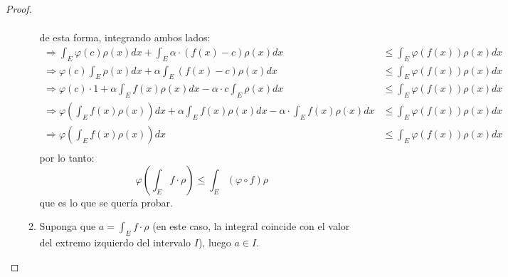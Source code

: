 \documentclass[12pt]{report}
\theoremstyle{largebreak}
\begin{document}
\begin{proof}
\begin{enumerate}
\begin{enumerate}
\begin{equation*}
\begin{split}
                    \end{split}
                \end{equation*}
                de esta forma, integrando ambos lados:
                \begin{equation*}
                    \begin{split}
                        \Rightarrow \int_E\varphi(c)\rho(x)dx+\int_E\alpha\cdot(f(x)-c)\rho(x)dx&\leq\int_E\varphi(f(x))\rho(x)dx\\
                        \Rightarrow \varphi(c)\int_E\rho(x)dx+\alpha\int_E(f(x)-c)\rho(x)dx&\leq\int_E\varphi(f(x))\rho(x)dx\\
                        \Rightarrow \varphi(c)\cdot1+\alpha\int_Ef(x)\rho(x)dx-\alpha\cdot c\int_E\rho(x)dx&\leq\int_E\varphi(f(x))\rho(x)dx\\
                        \Rightarrow \varphi(\int_Ef(x)\rho(x))dx+\alpha\int_Ef(x)\rho(x)dx-\alpha\cdot\int_Ef(x)\rho(x)dx&\leq\int_E\varphi(f(x))\rho(x)dx\\
                        \Rightarrow \varphi(\int_Ef(x)\rho(x))dx&\leq\int_E\varphi(f(x))\rho(x)dx\\
                    \end{split}
                \end{equation*}
                por lo tanto:
                \begin{equation*}
                    \varphi\left(\int_Ef\cdot\rho \right)\leq\int_E(\varphi\circ f)\rho
                \end{equation*}
                que es lo que se quería probar.

                \item Suponga que $a=\int_Ef\cdot\rho$ (en este caso, la integral coincide con el valor del extremo izquierdo del intervalo $I$), luego $a\in I$.
                

\end{enumerate}
\end{enumerate}
\end{proof}
\end{document}
